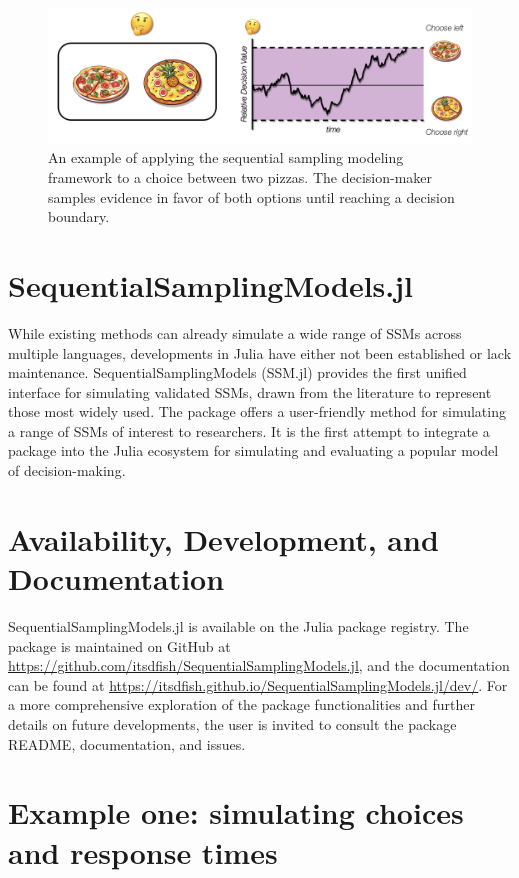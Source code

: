 \documentclass{juliacon}
\begin{document}
\begin{figure}
    \centering
    \includegraphics[width=1\linewidth]{paper/figures/SSM_example_fig1.png}
    \caption{An example of applying the sequential sampling modeling framework to a choice between two pizzas. The decision-maker samples evidence in favor of both options until reaching a decision boundary.}
    \label{fig:exampleSSM}
\end{figure}

\section{SequentialSamplingModels.jl}

While existing methods can already simulate a wide range of SSMs across multiple languages, developments in Julia have either not been established or lack maintenance. SequentialSamplingModels (SSM.jl) provides the first unified interface for simulating validated SSMs, drawn from the literature to represent those most widely used. The package offers a user-friendly method for simulating a range of SSMs of interest to researchers. It is the first attempt to integrate a package into the Julia ecosystem for simulating and evaluating a popular model of decision-making.

\section{Availability, Development, and Documentation}

SequentialSamplingModels.jl is available on the Julia package registry. The package is maintained on GitHub at \url{https://github.com/itsdfish/SequentialSamplingModels.jl}, and the documentation can be found at \url{https://itsdfish.github.io/SequentialSamplingModels.jl/dev/}. For a more comprehensive exploration of the package functionalities and further details on future developments, the user is invited to consult the package README, documentation, and issues.

\section{Example one: simulating choices and response times}
\end{document}

